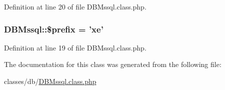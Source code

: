 Definition at line 20 of file D\-B\-Mssql.\-class.\-php.

\hypertarget{classDBMssql_a733cd192b424b5a66ea14e3e62391844}{
\subsubsection[{\$prefix}]{\setlength{\rightskip}{0pt plus 5cm}D\-B\-Mssql\-::\$prefix = 'xe'}}\label{classDBMssql_a733cd192b424b5a66ea14e3e62391844}


Definition at line 19 of file D\-B\-Mssql.\-class.\-php.



The documentation for this class was generated from the following file\-:\begin{DoxyCompactItemize}
\item 
classes/db/\hyperlink{DBMssql_8class_8php}{D\-B\-Mssql.\-class.\-php}\end{DoxyCompactItemize}
